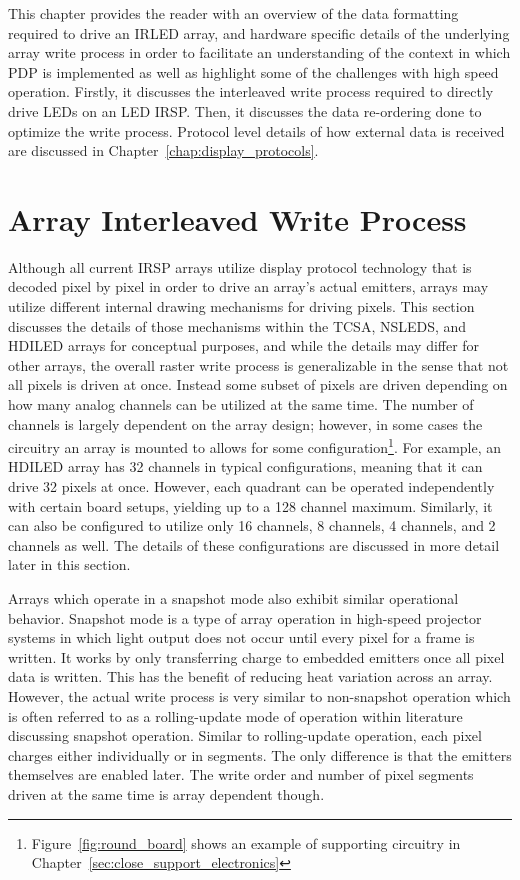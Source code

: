 \label{chap:array_write_process}
This chapter provides the reader with an overview of the data formatting required to drive an IRLED array, and hardware specific details of the underlying array write process in order to facilitate an understanding of the context in which PDP is implemented as well as highlight some of the challenges with high speed operation. Firstly, it discusses the interleaved write process required to directly drive LEDs on an LED IRSP. Then, it discusses the data re-ordering done to optimize the write process. Protocol level details of how external data is received are discussed in Chapter~\ref{chap:display_protocols}.


\section{Array Interleaved Write Process}
    \label{sec:array_Interleaved_write_process}
    Although all current IRSP arrays utilize display protocol technology that is decoded pixel by pixel in order to drive an array's actual emitters, arrays may utilize different internal drawing mechanisms for driving pixels. This section discusses the details of those mechanisms within the TCSA, NSLEDS, and HDILED arrays for conceptual purposes, and while the details may differ for other arrays, the overall raster write process is generalizable in the sense that not all pixels is driven at once. Instead some subset of pixels are driven depending on how many analog channels can be utilized at the same time. The number of channels is largely dependent on the array design; however, in some cases the circuitry an array is mounted to allows for some configuration\footnote{Figure~\ref{fig:round_board} shows an example of supporting circuitry in Chapter~\ref{sec:close_support_electronics}}. For example, an HDILED array has 32 channels in typical configurations, meaning that it can drive 32 pixels at once. However, each quadrant can be operated independently with certain board setups, yielding up to a 128 channel maximum. Similarly, it can also be configured to utilize only 16 channels, 8 channels, 4 channels, and 2 channels as well. The details of these configurations are discussed in more detail later in this section.

    Arrays which operate in a snapshot mode also exhibit similar operational behavior. Snapshot mode is a type of array operation in high-speed projector systems in which light output does not occur until every pixel for a frame is written. It works by only transferring charge to embedded emitters once all pixel data is written\cite{McHughEtAl1999}. This has the benefit of reducing heat variation across an array. However, the actual write process is very similar to non-snapshot operation which is often referred to as a rolling-update mode of operation within literature discussing snapshot operation. Similar to rolling-update operation, each pixel charges either individually or in segments. The only difference is that the emitters themselves are enabled later. The write order and number of pixel segments driven at the same time is array dependent though.

